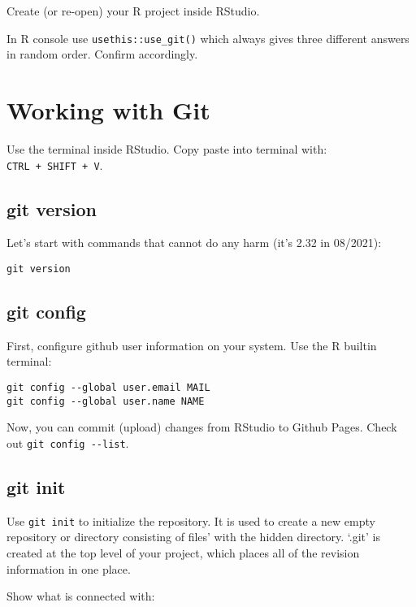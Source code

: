 \documentclass[
]{book}
\begin{document}
Create (or re-open) your R project inside RStudio.

In R console use \texttt{usethis::use\_git()} which always gives three different answers in random order. Confirm accordingly.

\hypertarget{working-with-git}{%
\section{Working with Git}\label{working-with-git}}

Use the terminal inside RStudio. Copy paste into terminal with: \texttt{CTRL\ +\ SHIFT\ +\ V}.

\hypertarget{git-version}{%
\subsection{git version}\label{git-version}}

Let's start with commands that cannot do any harm (it's 2.32 in 08/2021):

\begin{verbatim}
git version
\end{verbatim}

\hypertarget{git-config}{%
\subsection{git config}\label{git-config}}

First, configure github user information on your system. Use the R builtin terminal:

\begin{verbatim}
git config --global user.email MAIL
git config --global user.name NAME
\end{verbatim}

Now, you can commit (upload) changes from RStudio to Github Pages. Check out \texttt{git\ config\ -\/-list}.

\hypertarget{git-init}{%
\subsection{git init}\label{git-init}}

Use \texttt{git\ init} to initialize the repository. It is used to create a new empty repository or directory consisting of files' with the hidden directory. `.git' is created at the top level of your project, which places all of the revision information in one place.

Show what is connected with:
\end{document}
